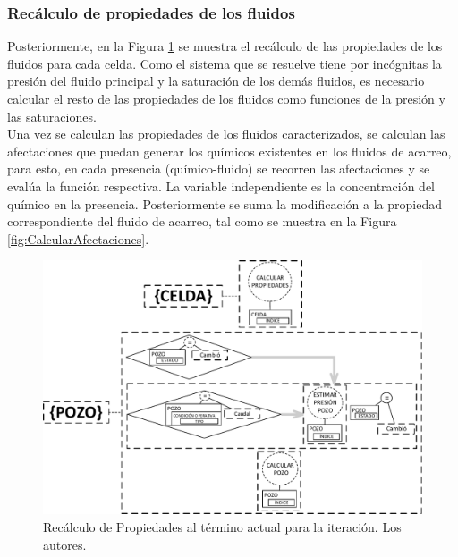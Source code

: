 \subsubsection{Recálculo de propiedades de los fluidos}\label{subsec:PS_TimeK}
Posteriormente, en la Figura \ref{fig:TimeK} se muestra el recálculo de las propiedades de los fluidos para cada celda. Como el sistema que se resuelve tiene por incógnitas la presión del fluido principal y la saturación de los demás fluidos, es necesario calcular el resto de las propiedades de los fluidos como funciones de la presión y las saturaciones. \\%

Una vez se calculan las propiedades de los fluidos caracterizados, se calculan las afectaciones que puedan generar los químicos existentes en los fluidos de acarreo, para esto, en cada presencia (químico-fluido) se recorren las afectaciones y se evalúa la función respectiva. La variable independiente es la concentración del químico en la presencia. Posteriormente se suma la modificación a la propiedad correspondiente del fluido de acarreo, tal como se muestra en la Figura \ref{fig:CalcularAfectaciones}.

\begin{figure}[h]
	\centering%
	\includegraphics[width=\linewidth]{Fig/TiempoK.pdf}%
	\caption[Recálculo de Propiedades al término actual para la iteración.]{Recálculo de Propiedades al término actual para la iteración. Los autores.} \label{fig:TimeK}
\end{figure}

